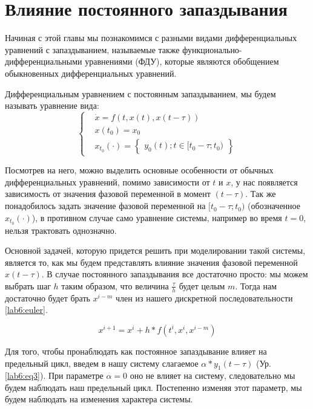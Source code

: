 \chapter{Влияние постоянного запаздывания}\label{lab6}

Начиная с этой главы мы познакомимся с разными видами
дифференциальных уравнений с запаздыванием, называемые
также функционально-дифференциальными уравнениями (ФДУ),
которые являются обобщением обыкновенных дифференциальных
уравнений.

\begin{definition}
    Дифференциальным уравнением с постоянным запаздыванием,
    мы будем называть уравнение вида:
    \begin{equation*}
        \begin{cases}
            &\dot{x} = f(t, x(t), x(t - \tau)) \\
            &x(t_0) = x_0 \\
            &x_{t_0}(\cdot) = \begin{Bmatrix}y_0(t); t \in [t_0 -\tau; t_0)\end{Bmatrix}
        \end{cases}
    \end{equation*}
\end{definition}

Посмотрев на него, можно выделить основные особенности от обычных дифференциальных
уравнений, помимо зависимости от $t$ и $x$, у нас появляется зависимость от
значения фазовой переменной в момент $(t-\tau)$. Так же
понадобилось задать значение фазовой переменной на $[t_0 -\tau; t_0)$
(обозначенное $x_{t_0}(\cdot)$),
в противном случае само уравнение системы, например во время $t=0$,
нельзя трактовать однозначно.

Основной задачей, которую придется решить при моделировании
такой системы, является то, как мы будем представлять
влияние значения фазовой переменной $x(t-\tau)$. В случае
постоянного запаздывания все достаточно просто:
мы можем выбрать шаг $h$ таким образом, что величина
$\frac{\tau}{h}$ будет целым $m$. Тогда нам достаточно будет
брать $x^{i-m}$ член из нашего дискретной последовательности
\eqref{lab6:euler}.

\begin{equation}\label{lab6:euler}
    x^{i+1} = x^i + h*f(t^i, x^i, x^{i-m})
\end{equation}

\clearpage
Для того, чтобы пронаблюдать как постоянное запаздывание
влияет на предельный цикл, введем в нашу систему слагаемое
$\alpha * y_1(t-\tau)$ (Ур. \eqref{lab6:eq3}). При параметре
$\alpha = 0$ оно не влияет на систему, следовательно мы будем
наблюдать наш предельный цикл. Постепенно изменяя этот параметр,
мы будем наблюдать на изменения характера системы.

